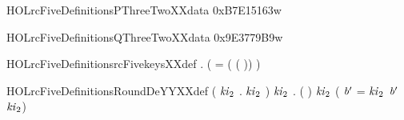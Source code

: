 \newcommand{\HOLrcFiveDefinitionsLkeysSupXXdef}{\UseVerbatim{HOLrcFiveDefinitionsLkeysSupXXdef}}
\begin{SaveVerbatim}{HOLrcFiveDefinitionsPThreeTwoXXdata}
\HOLTokenTurnstile{}  \HOLSymConst{=} 0xB7E15163w
\end{SaveVerbatim}
\newcommand{\HOLrcFiveDefinitionsPThreeTwoXXdata}{\UseVerbatim{HOLrcFiveDefinitionsPThreeTwoXXdata}}
\begin{SaveVerbatim}{HOLrcFiveDefinitionsQThreeTwoXXdata}
\HOLTokenTurnstile{}  \HOLSymConst{=} 0x9E3779B9w
\end{SaveVerbatim}
\newcommand{\HOLrcFiveDefinitionsQThreeTwoXXdata}{\UseVerbatim{HOLrcFiveDefinitionsQThreeTwoXXdata}}
\begin{SaveVerbatim}{HOLrcFiveDefinitionsrcFivekeysXXdef}
\HOLTokenTurnstile{} \HOLSymConst{\HOLTokenForall{}} .
        \HOLSymConst{=}
     (  =  \HOLSymConst{\HOLTokenProd{}}  ( \HOLSymConst{\HOLTokenProd{}} ( \HOLSymConst{\ensuremath{+}} ))      )
\end{SaveVerbatim}
\newcommand{\HOLrcFiveDefinitionsrcFivekeysXXdef}{\UseVerbatim{HOLrcFiveDefinitionsrcFivekeysXXdef}}
\begin{SaveVerbatim}{HOLrcFiveDefinitionsRoundDeYYXXdef}
\HOLTokenTurnstile{} (\HOLSymConst{\HOLTokenForall{}} \ensuremath{\HOLBoundVar{ki}\sb{\mathrm{2}}} .    \ensuremath{\HOLBoundVar{ki}\sb{\mathrm{2}}}  \HOLSymConst{=} ) \HOLSymConst{\HOLTokenConj{}}
   \HOLSymConst{\HOLTokenForall{}}  \ensuremath{\HOLBoundVar{ki}\sb{\mathrm{2}}} .
      ( )  \ensuremath{\HOLBoundVar{ki}\sb{\mathrm{2}}}  \HOLSymConst{=}
     ( \ensuremath{\HOLBoundVar{b}\sp{\prime{}}} =    \ensuremath{\HOLBoundVar{ki}\sb{\mathrm{2}}}    \ensuremath{\HOLBoundVar{b}\sp{\prime{}}}  \ensuremath{\HOLBoundVar{ki}\sb{\mathrm{2}}})
\end{SaveVerbatim}
\newcommand{\HOLrcFiveDefinitionsRoundDeYYXXdef}{\UseVerbatim{HOLrcFiveDefinitionsRoundDeYYXXdef}}
